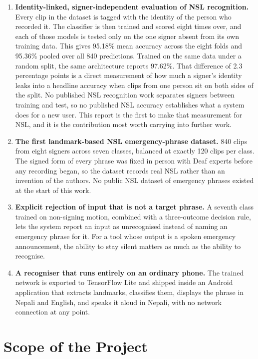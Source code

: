 \begin{enumerate}
    \item \textbf{Identity-linked, signer-independent evaluation of NSL recognition.} Every clip in the dataset is tagged with the identity of the person who recorded it. The classifier is then trained and scored eight times over, and each of those models is tested only on the one signer absent from its own training data. This gives 95.18\% mean accuracy across the eight folds and 95.36\% pooled over all 840 predictions. Trained on the same data under a random split, the same architecture reports 97.62\%. That difference of 2.3 percentage points is a direct measurement of how much a signer's identity leaks into a headline accuracy when clips from one person sit on both sides of the split. No published NSL recognition work separates signers between training and test, so no published NSL accuracy establishes what a system does for a new user. This report is the first to make that measurement for NSL, and it is the contribution most worth carrying into further work.

    \item \textbf{The first landmark-based NSL emergency-phrase dataset.} 840 clips from eight signers across seven classes, balanced at exactly 120 clips per class. The signed form of every phrase was fixed in person with Deaf experts before any recording began, so the dataset records real NSL rather than an invention of the authors. No public NSL dataset of emergency phrases existed at the start of this work.

    \item \textbf{Explicit rejection of input that is not a target phrase.} A seventh class trained on non-signing motion, combined with a three-outcome decision rule, lets the system report an input as unrecognised instead of naming an emergency phrase for it. For a tool whose output is a spoken emergency announcement, the ability to stay silent matters as much as the ability to recognise.

    \item \textbf{A recogniser that runs entirely on an ordinary phone.} The trained network is exported to TensorFlow Lite and shipped inside an Android application that extracts landmarks, classifies them, displays the phrase in Nepali and English, and speaks it aloud in Nepali, with no network connection at any point.
\end{enumerate}

\section{Scope of the Project}

